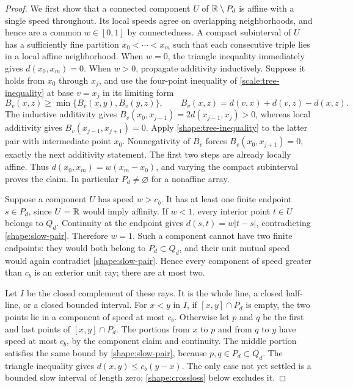 \begin{proof}
We first show that a connected component $U$ of $\mathbb{R}\setminus P_d$ is
affine with a single speed throughout.  Its local speeds agree on
overlapping neighborhoods, and hence are a common $w\in[0,1]$ by
connectedness.  A compact subinterval of $U$ has a sufficiently fine
partition $x_0<\cdots<x_m$ such that each consecutive triple lies in a
local affine neighborhood.  When $w=0$, the triangle inequality
immediately gives $d(x_0,x_m)=0$.  When $w>0$, propagate additivity
inductively.  Suppose it holds from $x_0$ through $x_j$, and use the
four-point inequality of \cref{scale:tree-inequality} at base $v=x_j$ in its
limiting form
\begin{equation}\label{shape:tree-inequality}
 B_v(x,z)\ge\min\{B_v(x,y),B_v(y,z)\},\qquad
 B_v(x,z)=d(v,x)+d(v,z)-d(x,z).
\end{equation}
The inductive additivity gives
$B_v(x_0,x_{j-1})=2d(x_{j-1},x_j)>0$, whereas local additivity gives
$B_v(x_{j-1},x_{j+1})=0$.  Apply
\cref{shape:tree-inequality} to the latter pair with intermediate point
$x_0$.  Nonnegativity of $B_v$ forces $B_v(x_0,x_{j+1})=0$, exactly the
next additivity statement.  The first two steps are already locally
affine.  Thus $d(x_0,x_m)=w(x_m-x_0)$, and varying the compact subinterval
proves the claim.  In particular $P_d\ne\varnothing$ for a nonaffine
array.

Suppose a component $U$ has speed $w>c_b$.  It has at least one finite
endpoint $s\in P_d$, since $U=\mathbb{R}$ would imply affinity.  If $w<1$, every
interior point $t\in U$ belongs to $Q_d$.  Continuity at the endpoint gives
$d(s,t)=w|t-s|$, contradicting \cref{shape:slow-pair}.  Therefore $w=1$.
Such a component cannot have two finite endpoints: they would both belong
to $P_d\subset Q_d$, and their unit mutual speed would again contradict
\cref{shape:slow-pair}.  Hence every component of speed greater than
$c_b$ is an exterior unit ray; there are at most two.

Let $I$ be the closed complement of these rays.  It is the whole line, a
closed half-line, or a closed bounded interval.  For $x<y$ in $I$, if
$[x,y]\cap P_d$ is empty, the two points lie in a component of speed at
most $c_b$.  Otherwise let $p$ and $q$ be the first and last points of
$[x,y]\cap P_d$.  The portions from $x$ to $p$ and from $q$ to $y$ have
speed at most $c_b$, by the component claim and continuity.  The middle
portion satisfies the same bound by \cref{shape:slow-pair}, because
$p,q\in P_d\subset Q_d$.  The triangle inequality gives
$d(x,y)\le c_b(y-x)$.  The only case not yet settled is a bounded slow
interval of length zero; \cref{shape:crossloss} below excludes it.
\end{proof}

